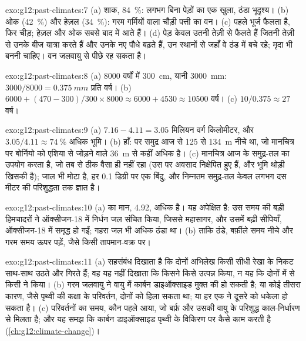 \begin{solution}{exo:g12:past-climates:7}
(a) शाक, \qty{84}{\percent}: लगभग बिना पेड़ों का एक खुला, ठंडा भूदृश्य।
(b) ओक (\qty{42}{\percent}) और हेज़ल (\qty{34}{\percent}): गरम गर्मियों वाला
चौड़ी पत्ती का वन। (c) पहले भूर्ज फैलता है, फिर चीड़; हेज़ल और ओक
सबसे बाद में आते हैं। (d) पेड़ केवल उतनी तेज़ी से फैलते हैं जितनी तेज़ी से उनके बीज यात्रा करते हैं और उनके
नए पौधे बढ़ते हैं, उन स्थानों से जहाँ वे ठंड में बचे रहे; मृदा भी
बननी चाहिए। वन जलवायु से पीछे रह सकता है।
\end{solution}

\begin{solution}{exo:g12:past-climates:8}
(a) \num{8000} वर्षों में \qty{300}{cm}, यानी \qty{3000}{mm}: $3000/8000 =
\qty{0.375}{mm}$ प्रति वर्ष। (b) $\num{6000} + (470 - 300)/300 \times \num{8000}
\approx \num{6000} + \num{4530} \approx \num{10500}$ वर्ष। (c) $10/0.375
\approx 27$ वर्ष।
\end{solution}

\begin{solution}{exo:g12:past-climates:9}
(a) $7.16 - 4.11 = 3.05$ मिलियन वर्ग किलोमीटर, और $3.05/4.11 \approx
\qty{74}{\percent}$ अधिक भूमि। (b) हाँ:  पर समुद्र
आज से 125 से \qty{134}{m} नीचे था, जो मानचित्र पर बोर्नियो को एशिया से जोड़ने वाले
\qty{36}{m} से कहीं अधिक है। (c) मानचित्र आज के समुद्र-तल का उपयोग करता है, जो तब से
ठीक वैसा ही नहीं रहा (उस पर अवसाद निक्षेपित हुए हैं, और
भूमि थोड़ी खिसकी है); जाल भी मोटा है, हर 0.1
डिग्री पर एक बिंदु, और निम्नतम समुद्र-तल केवल लगभग दस मीटर की परिशुद्धता तक ज्ञात है।
\end{solution}

\begin{solution}{exo:g12:past-climates:10}
(a)  का मान, \qty{4.92}{\permil}, अधिक
है। यह अपेक्षित है: उस समय की बड़ी हिमचादरों ने ऑक्सीजन-18 में निर्धन
जल संचित किया, जिससे महासागर, और उसमें बढ़ी सीपियाँ, ऑक्सीजन-18 में
समृद्ध हो गईं; गहरा जल भी अधिक ठंडा था। (b) ताकि ठंडे, बर्फ़ीले समय
नीचे और गरम समय ऊपर पड़ें, जैसे किसी तापमान-वक्र पर।
\end{solution}

\begin{solution}{exo:g12:past-climates:11}
(a) सहसंबंध दिखाता है कि दोनों अभिलेख किसी सीधी रेखा के निकट
साथ-साथ उठते और गिरते हैं; वह यह नहीं दिखाता कि किसने किसे उत्पन्न किया, न यह कि दोनों में से किसी ने
किया। (b) गरम जलवायु ने वायु में कार्बन डाइऑक्साइड मुक्त की हो सकती है;
या कोई तीसरा कारण, जैसे पृथ्वी की कक्षा के परिवर्तन, दोनों को हिला सकता
था; या हर एक ने दूसरे को धकेला हो सकता है। (c) परिवर्तनों का समय,
कौन पहले आया, जो बर्फ़ और उसकी वायु के परिशुद्ध काल-निर्धारण से मिलता है; और यह
समझ कि कार्बन डाइऑक्साइड पृथ्वी के विकिरण पर कैसे काम करती है
(\cref{ch:g12:climate-change})।
\end{solution}

